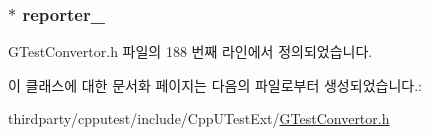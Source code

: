 \subsubsection[{\texorpdfstring{reporter\+\_\+}{reporter_}}]{$\ast$ reporter\+\_\+\hspace{0.3cm}{\ttfamily [private]}}\hypertarget{class_g_test_convertor_aaae29ad8be94f4d3878de73b594deac6}{}\label{class_g_test_convertor_aaae29ad8be94f4d3878de73b594deac6}


G\+Test\+Convertor.\+h 파일의 188 번째 라인에서 정의되었습니다.



이 클래스에 대한 문서화 페이지는 다음의 파일로부터 생성되었습니다.\+:\begin{DoxyCompactItemize}
\item 
thirdparty/cpputest/include/\+Cpp\+U\+Test\+Ext/\hyperlink{_g_test_convertor_8h}{G\+Test\+Convertor.\+h}\end{DoxyCompactItemize}
